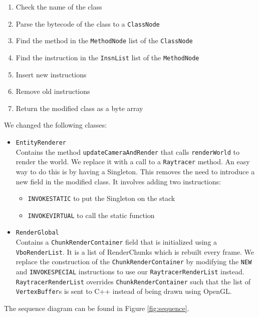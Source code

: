 \documentclass[]{article}
\begin{document}
\begin{enumerate}
  \item Check the name of the class
  \item Parse the bytecode of the class to a \texttt{ClassNode}
  \item Find the method in the \texttt{MethodNode} list of the \texttt{ClassNode}
  \item Find the instruction in the \texttt{InsnList} list of the \texttt{MethodNode}
  \item Insert new instructions
  \item Remove old instructions
  \item Return the modified class as a byte array
\end{enumerate}

We changed the following classes:

\begin{itemize}
  \item \texttt{EntityRenderer} \\
    Contains the method \texttt{updateCameraAndRender} that calls \texttt{renderWorld} to render the world.
    We replace it with a call to a \texttt{Raytracer} method.
    An easy way to do this is by having a Singleton.
    This removes the need to introduce a new field in the modified class.
    It involves adding two instructions:
    \begin{itemize}
      \item \texttt{INVOKESTATIC} to put the Singleton on the stack
      \item \texttt{INVOKEVIRTUAL} to call the static function
    \end{itemize}
  \item \texttt{RenderGlobal} \\
    Contains a \texttt{ChunkRenderContainer} field that is initialized using a \texttt{VboRenderList}.
    It is a list of RenderChunks which is rebuilt every frame.
    We replace the construction of the \texttt{ChunkRenderContainer} by modifying the \texttt{NEW} and \texttt{INVOKESPECIAL} instructions to use our \texttt{RaytracerRenderList} instead.
    \texttt{RaytracerRenderList} overrides \texttt{ChunkRenderContainer} such that the list of \texttt{VertexBuffer}s is sent to C++ instead of being drawn using OpenGL.
\end{itemize}
The sequence diagram can be found in Figure \ref{fig:sequence}.
\end{document}
